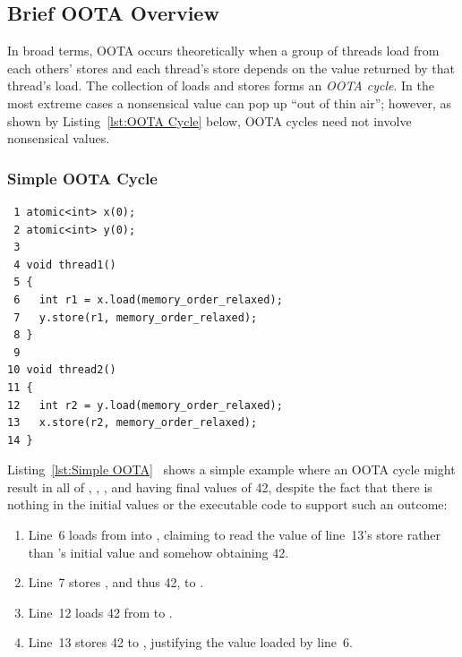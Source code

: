 \documentclass[10]{article}
\begin{document}
\subsection{Brief OOTA Overview}
\label{sec:Brief OOTA Overview}

In broad terms,
OOTA occurs theoretically when a group of threads load from each others' stores
and each thread's store depends on the value returned by that thread's load.
The collection of loads and stores forms an \emph{OOTA cycle}.
In the most extreme cases a nonsensical value can pop up ``out of thin air'';
however, as shown by
Listing~\ref{lst:OOTA Cycle} below,
OOTA cycles need not involve nonsensical values.

\subsubsection{Simple OOTA Cycle}
\label{sec:Simple OOTA Cycle}

\begin{listing}[tbp]
\begin{verbatim}
 1 atomic<int> x(0);
 2 atomic<int> y(0);
 3
 4 void thread1()
 5 {
 6   int r1 = x.load(memory_order_relaxed);
 7   y.store(r1, memory_order_relaxed);
 8 }
 9
10 void thread2()
11 {
12   int r2 = y.load(memory_order_relaxed);
13   x.store(r2, memory_order_relaxed);
14 }
\end{verbatim}
\caption{Simple OOTA}
\label{lst:Simple OOTA}
\end{listing}

Listing~\ref{lst:Simple OOTA}~\cite{PaulEMcKenney2020RelaxedGuideRelaxed}
shows a simple example where an OOTA cycle might result in all of ,
, , and  having final values of 42, despite the fact
that there is nothing in the initial values or the executable code to
support such an outcome:

\begin{enumerate}
\item   Line~6 loads from  into , claiming to read
	the value of line~13's store rather than 's initial value
	and somehow obtaining 42.
\item   Line~7 stores , and thus 42, to .
\item   Line~12 loads 42 from  to .
\item   Line~13 stores 42 to , justifying the value loaded by line~6.
\end{enumerate}
\end{document}
